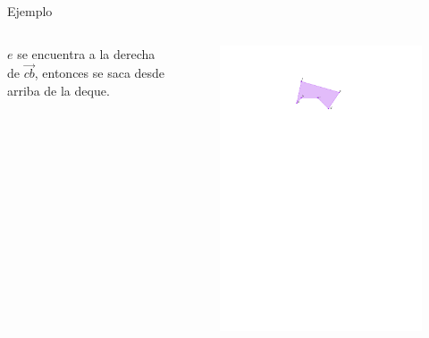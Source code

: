\documentclass[aspectratio=169,xcolor=dvipsnames, t]{beamer}
\begin{document}
\begin{frame}{Ejemplo}
  \begin{columns}
    \begin{column}{0.5\textwidth}
      $e$ se encuentra a la derecha de $\overrightarrow{cb}$, entonces se saca desde arriba de la deque.
    \end{column}
    \begin{column}{0.5\textwidth}
      \begin{figure}
        \centering
        \includegraphics[width=\linewidth, height=0.5\textheight, page=9, keepaspectratio]{IPE/Melkman.pdf}
      \end{figure}
    \end{column}
  \end{columns}
\end{frame}
\end{document}
